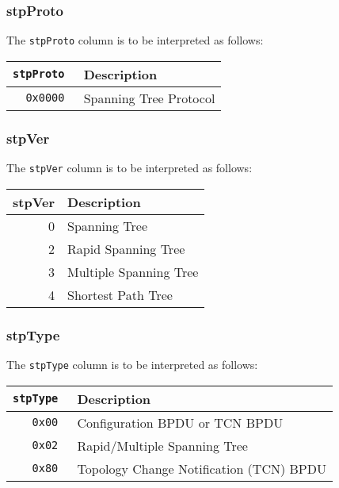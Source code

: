 \documentclass[documentation]{subfiles}
\begin{document}
\subsubsection{stpProto}\label{stpProto}
The {\tt stpProto} column is to be interpreted as follows:
\begin{longtable}{>{\tt}rl}
    \toprule
    {\bf stpProto} & {\bf Description}\\
    \midrule\endhead%
    0x0000 & Spanning Tree Protocol\\
    \bottomrule
\end{longtable}

\subsubsection{stpVer}\label{stpVer}
The {\tt stpVer} column is to be interpreted as follows:
\begin{longtable}{rl}
    \toprule
    {\bf stpVer} & {\bf Description}\\
    \midrule\endhead%
    0 & Spanning Tree\\
    2 & Rapid Spanning Tree\\
    3 & Multiple Spanning Tree\\
    4 & Shortest Path Tree\\
    \bottomrule
\end{longtable}

\clearpage
\subsubsection{stpType}\label{stpType}
The {\tt stpType} column is to be interpreted as follows:
\begin{longtable}{>{\tt}rl}
    \toprule
    {\bf stpType} & {\bf Description}\\
    \midrule\endhead%
    0x00 & Configuration BPDU or TCN BPDU\\
    0x02 & Rapid/Multiple Spanning Tree\\
    0x80 & Topology Change Notification (TCN) BPDU\\
    \bottomrule
\end{longtable}
\end{document}
